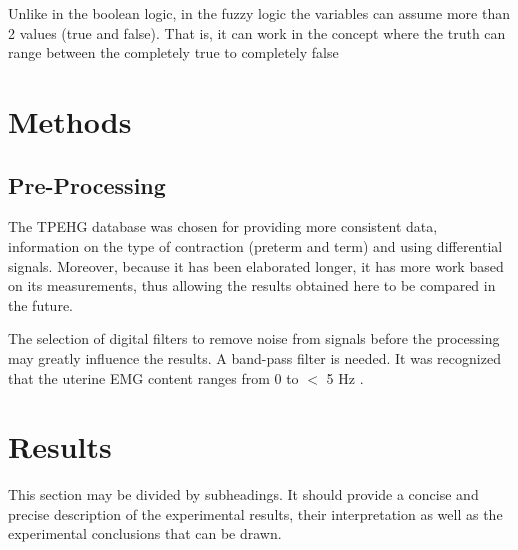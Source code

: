 \documentclass[bioengineering,article,submit,moreauthors,pdftex,10pt,a4paper]{mdpi}
\begin{document}
 Unlike in the boolean logic, in the fuzzy logic the variables can assume more than 2 values (true and false). That is, it can work in the concept where the truth can range between the completely true to completely false \cite{ref-novak}
 
 
 
 \section{Methods}

 \subsection{Pre-Processing}
 
 The TPEHG database was chosen for providing more consistent data, information on the type of contraction (preterm and term) and using differential signals. Moreover, because it has been elaborated longer, it has more work based on its measurements, thus allowing the results obtained here to be compared in the future.
 
 The selection of digital filters to remove noise from signals
 before the processing may greatly influence the results.
 A band-pass filter is needed. It was recognized that the uterine
 EMG content ranges from 0 to $<$ 5 Hz \cite{ref-devedeux}.
 
 
 
 
 
 
 
 
 
 
 
 
 
 
 
 
 
 
 
 
 
 
 


 
 
\section{Results}

This section may be divided by subheadings. It should provide a concise and precise description of the experimental results, their interpretation as well as the experimental conclusions that can be drawn.


\end{document}

